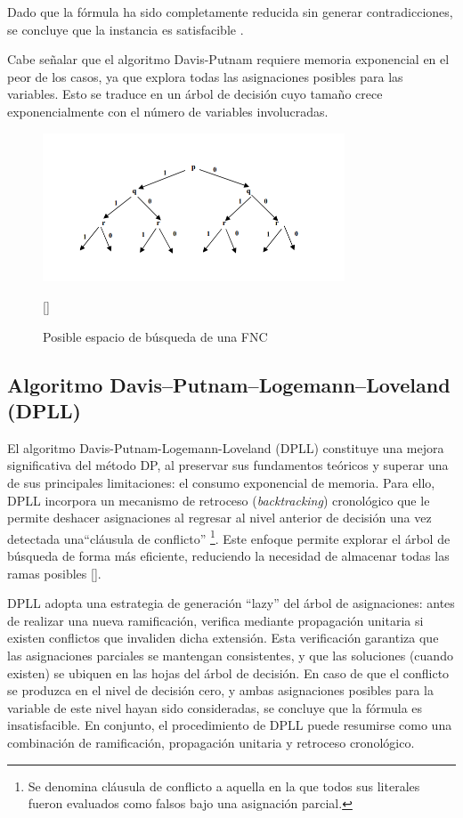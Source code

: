 Dado que la fórmula ha sido completamente reducida sin generar contradicciones, se concluye que la instancia es satisfacible \cite{garcia-satcap}.

Cabe señalar que el algoritmo Davis-Putnam requiere memoria exponencial en el peor de los casos, ya que explora todas las asignaciones posibles para las variables. Esto se traduce en un árbol de decisión cuyo tamaño crece exponencialmente con el número de variables involucradas.

\begin{figure}[ht]
    \centering
    \includegraphics[width=0.8\textwidth]{Graphics/arboldp.png}
    \caption{Posible espacio de b\'usqueda de una FNC}
    [\cite{garcia-satcap}]
    \label{fig:arbol DP}
\end{figure}


\subsection{Algoritmo Davis–Putnam–Logemann–Loveland (DPLL)}
\label{subsec:dpll}
El algoritmo Davis-Putnam-Logemann-Loveland (DPLL) constituye una mejora significativa del método DP, al preservar sus fundamentos teóricos y superar una de sus principales limitaciones: el consumo exponencial de memoria. Para ello, DPLL incorpora un mecanismo de retroceso (\textit{backtracking}) cronológico que le permite deshacer asignaciones al regresar al nivel anterior de decisión una vez detectada una``cláusula de conflicto'' \footnote{Se denomina cláusula de conflicto a aquella en la que todos sus literales fueron evaluados como falsos bajo una asignación parcial.}. Este enfoque permite explorar el árbol de búsqueda de forma más eficiente, reduciendo la necesidad de almacenar todas las ramas posibles [\cite{garcia-satcap}].

DPLL adopta una estrategia de generación ``lazy'' del árbol de asignaciones: antes de realizar una nueva ramificación, verifica mediante propagación unitaria si existen conflictos que invaliden dicha extensión. Esta verificación garantiza que las asignaciones parciales se mantengan consistentes, y que las soluciones (cuando existen) se ubiquen en las hojas del árbol de decisión. En caso de que el conflicto se produzca en el nivel de decisión cero, y ambas asignaciones posibles para la variable de este nivel hayan sido consideradas, se concluye que la fórmula es insatisfacible. En conjunto, el procedimiento de DPLL puede resumirse como una combinación de ramificación, propagación unitaria y retroceso cronol\'ogico.


